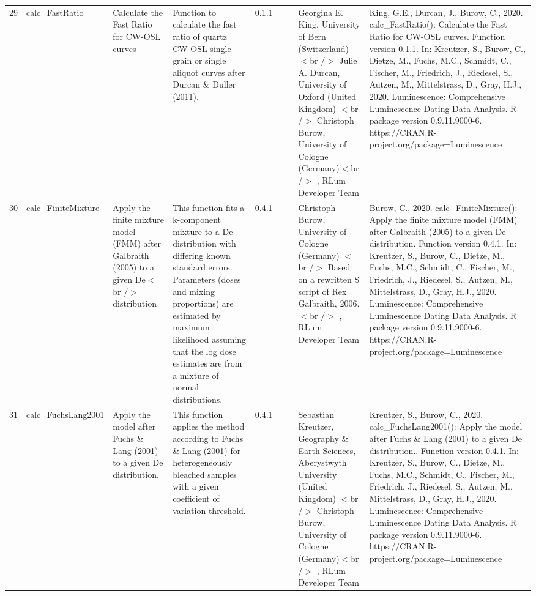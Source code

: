 \begin{table}[ht]
\begin{tabular}{rllllllll}
 \\ 
  29 & calc\_FastRatio & Calculate the Fast Ratio for CW-OSL curves & Function to calculate the fast ratio of quartz CW-OSL single grain or single aliquot curves after Durcan \& Duller (2011). & 0.1.1
 &  &  & Georgina E. King, University of Bern (Switzerland)  $<$br /$>$ Julie A. Durcan, University of Oxford (United Kingdom)  $<$br /$>$ Christoph Burow, University of Cologne (Germany)$<$br /$>$ , RLum Developer Team & King, G.E., Durcan, J., Burow, C., 2020. calc\_FastRatio(): Calculate the Fast Ratio for CW-OSL curves. Function version 0.1.1. In: Kreutzer, S., Burow, C., Dietze, M., Fuchs, M.C., Schmidt, C., Fischer, M., Friedrich, J., Riedesel, S., Autzen, M., Mittelstrass, D., Gray, H.J., 2020. Luminescence: Comprehensive Luminescence Dating Data Analysis. R package version 0.9.11.9000-6. https://CRAN.R-project.org/package=Luminescence
 \\ 
  30 & calc\_FiniteMixture & Apply the finite mixture model (FMM) after Galbraith (2005) to a given De$<$br /$>$ distribution & This function fits a k-component mixture to a De distribution with differing known standard errors. Parameters (doses and mixing proportions) are estimated by maximum likelihood assuming that the log dose estimates are from a mixture of normal distributions. & 0.4.1
 &  &  & Christoph Burow, University of Cologne (Germany)  $<$br /$>$ Based on a rewritten S script of Rex Galbraith, 2006.$<$br /$>$ , RLum Developer Team & Burow, C., 2020. calc\_FiniteMixture(): Apply the finite mixture model (FMM) after Galbraith (2005) to a given De distribution. Function version 0.4.1. In: Kreutzer, S., Burow, C., Dietze, M., Fuchs, M.C., Schmidt, C., Fischer, M., Friedrich, J., Riedesel, S., Autzen, M., Mittelstrass, D., Gray, H.J., 2020. Luminescence: Comprehensive Luminescence Dating Data Analysis. R package version 0.9.11.9000-6. https://CRAN.R-project.org/package=Luminescence
 \\ 
  31 & calc\_FuchsLang2001 & Apply the model after Fuchs \& Lang (2001) to a given De distribution. & This function applies the method according to Fuchs \& Lang (2001) for heterogeneously bleached samples with a given coefficient of variation threshold. & 0.4.1
 &  &  & Sebastian Kreutzer, Geography \& Earth Sciences, Aberystwyth University (United Kingdom)  $<$br /$>$ Christoph Burow, University of Cologne (Germany)$<$br /$>$ , RLum Developer Team & Kreutzer, S., Burow, C., 2020. calc\_FuchsLang2001(): Apply the model after Fuchs \& Lang (2001) to a given De distribution.. Function version 0.4.1. In: Kreutzer, S., Burow, C., Dietze, M., Fuchs, M.C., Schmidt, C., Fischer, M., Friedrich, J., Riedesel, S., Autzen, M., Mittelstrass, D., Gray, H.J., 2020. Luminescence: Comprehensive Luminescence Dating Data Analysis. R package version 0.9.11.9000-6. https://CRAN.R-project.org/package=Luminescence

\end{tabular}
\end{table}
